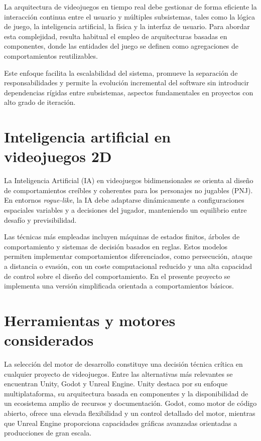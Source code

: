 La arquitectura de videojuegos en tiempo real debe gestionar de forma eficiente la interacción continua entre el usuario y múltiples subsistemas, tales como la lógica de juego, la inteligencia artificial, la física y la interfaz de usuario. Para abordar esta complejidad, resulta habitual el empleo de arquitecturas basadas en componentes, donde las entidades del juego se definen como agregaciones de comportamientos reutilizables.

Este enfoque facilita la escalabilidad del sistema, promueve la separación de responsabilidades y permite la evolución incremental del software sin introducir dependencias rígidas entre subsistemas, aspectos fundamentales en proyectos con alto grado de iteración.

\section{Inteligencia artificial en videojuegos 2D}

La Inteligencia Artificial (IA) en videojuegos bidimensionales se orienta al diseño de comportamientos creíbles y coherentes para los personajes no jugables (PNJ). En entornos \textit{rogue-like}, la IA debe adaptarse dinámicamente a configuraciones espaciales variables y a decisiones del jugador, manteniendo un equilibrio entre desafío y previsibilidad.

Las técnicas más empleadas incluyen máquinas de estados finitos, árboles de comportamiento y sistemas de decisión basados en reglas. Estos modelos permiten implementar comportamientos diferenciados, como persecución, ataque a distancia o evasión, con un coste computacional reducido y una alta capacidad de control sobre el diseño del comportamiento. En el presente proyecto se implementa una versión simplificada orientada a comportamientos básicos.

\section{Herramientas y motores considerados}

La selección del motor de desarrollo constituye una decisión técnica crítica en cualquier proyecto de videojuegos. Entre las alternativas más relevantes se encuentran Unity, Godot y Unreal Engine. Unity destaca por su enfoque multiplataforma, su arquitectura basada en componentes y la disponibilidad de un ecosistema amplio de recursos y documentación. Godot, como motor de código abierto, ofrece una elevada flexibilidad y un control detallado del motor, mientras que Unreal Engine proporciona capacidades gráficas avanzadas orientadas a producciones de gran escala.

